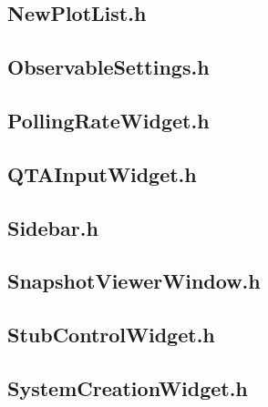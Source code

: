 \subsection{NewPlotList.h}


\subsection{ObservableSettings.h}


\subsection{PollingRateWidget.h}


\subsection{QTAInputWidget.h}


\subsection{Sidebar.h}


\subsection{SnapshotViewerWindow.h}


\subsection{StubControlWidget.h}


\subsection{SystemCreationWidget.h}


